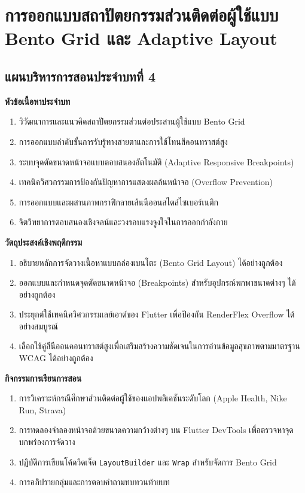 \chapter{การออกแบบสถาปัตยกรรมส่วนติดต่อผู้ใช้แบบ Bento Grid และ Adaptive Layout}
\label{chap:ch04}

\section*{แผนบริหารการสอนประจำบทที่ 4}

\noindent\textbf{หัวข้อเนื้อหาประจำบท}
\begin{enumerate}
    \item วิวัฒนาการและแนวคิดสถาปัตยกรรมส่วนต่อประสานผู้ใช้แบบ Bento Grid
    \item การออกแบบลำดับขั้นการรับรู้ทางสายตาและการใช้โทนสีคอนทราสต์สูง
    \item ระบบจุดตัดขนาดหน้าจอแบบตอบสนองอัตโนมัติ (Adaptive Responsive Breakpoints)
    \item เทคนิควิศวกรรมการป้องกันปัญหาการแสดงผลล้นหน้าจอ (Overflow Prevention)
    \item การออกแบบและผสานภาพกราฟิกลายเส้นนีออนสไตล์ไซเบอร์เนติก
    \item จิตวิทยาการตอบสนองเชิงจลน์และวงรอบแรงจูงใจในการออกกำลังกาย
\end{enumerate}

\noindent\textbf{วัตถุประสงค์เชิงพฤติกรรม}
\begin{enumerate}
    \item อธิบายหลักการจัดวางเนื้อหาแบบกล่องเบนโตะ (Bento Grid Layout) ได้อย่างถูกต้อง
    \item ออกแบบและกำหนดจุดตัดขนาดหน้าจอ (Breakpoints) สำหรับอุปกรณ์พกพาขนาดต่างๆ ได้อย่างถูกต้อง
    \item ประยุกต์ใช้เทคนิควิศวกรรมเลย์เอาต์ของ Flutter เพื่อป้องกัน RenderFlex Overflow ได้อย่างสมบูรณ์
    \item เลือกใช้คู่สีนีออนคอนทราสต์สูงเพื่อเสริมสร้างความชัดเจนในการอ่านข้อมูลสุขภาพตามมาตรฐาน WCAG ได้อย่างถูกต้อง
\end{enumerate}

\noindent\textbf{กิจกรรมการเรียนการสอน}
\begin{enumerate}
    \item การวิเคราะห์กรณีศึกษาส่วนติดต่อผู้ใช้ของแอปพลิเคชันระดับโลก (Apple Health, Nike Run, Strava)
    \item การทดลองจำลองหน้าจอด้วยขนาดความกว้างต่างๆ บน Flutter DevTools เพื่อตรวจหาจุดบกพร่องการจัดวาง
    \item ปฏิบัติการเขียนโค้ดวิดเจ็ต \texttt{LayoutBuilder} และ \texttt{Wrap} สำหรับจัดการ Bento Grid
    \item การอภิปรายกลุ่มและการตอบคำถามทบทวนท้ายบท
\end{enumerate}

